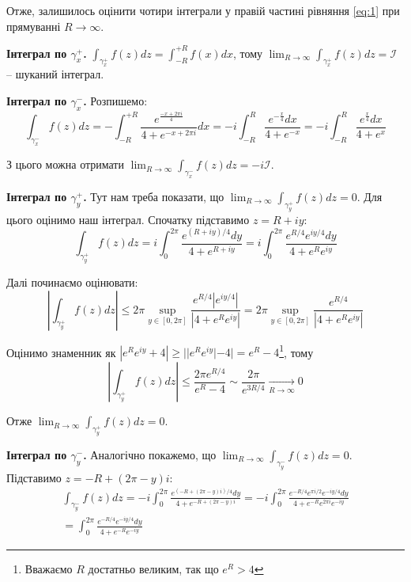\documentclass[oneside,solution]{karazin-complan-assign}
\begin{document}
Отже, залишилось оцінити чотири інтеграли у правій частині рівняння \ref{eq:1} при прямуванні $R \to \infty$. 

\textbf{Інтеграл по $\gamma_x^+$.} $\int_{\gamma_x^+}f(z)dz = \int_{-R}^{+R}f(x)dx$, тому $\lim_{R \to \infty}\int_{\gamma_x^+}f(z)dz = \mathcal{I}$ -- шуканий інтеграл.

\textbf{Інтеграл по $\gamma_x^-$.} Розпишемо:
\begin{equation}
    \int_{\gamma_x^-}f(z)dz = -\int_{-R}^{+R} \frac{e^{\frac{-x+2\pi i}{4}}}{4+e^{-x+2\pi i}}dx = -i \int_{-R}^R \frac{e^{-\frac{x}{4}}dx}{4+e^{-x}} = -i \int_{-R}^R \frac{e^{\frac{x}{4}}dx}{4+e^{x}}
\end{equation}

З цього можна отримати $\lim_{R \to \infty} \int_{\gamma_x^-}f(z)dz = -i\mathcal{I}$. 

\textbf{Інтеграл по $\gamma_y^+$.} Тут нам треба показати, що $\lim_{R \to \infty}\int_{\gamma_y^+}f(z)dz = 0$. Для цього оцінимо наш інтеграл. Спочатку підставимо $z=R+iy$:
\begin{equation}
    \int_{\gamma_y^+}f(z)dz = i\int_0^{2\pi} \frac{e^{(R+iy)/4}dy}{4+e^{R+iy}} = i \int_0^{2\pi} \frac{e^{R/4}e^{iy/4}dy}{4+e^Re^{iy}}
\end{equation}

Далі починаємо оцінювати:
\begin{equation}
    \left|\int_{\gamma_y^+}f(z)dz\right| \leq 2\pi \sup_{y \in [0,2\pi]} \frac{e^{R/4}|e^{iy/4}|}{|4+e^Re^{iy}|} = 2\pi \sup_{y \in [0,2\pi]} \frac{e^{R/4}}{|4+e^Re^{iy}|}
\end{equation}

Оцінимо знаменник як $|e^Re^{iy} + 4| \geq ||e^Re^{iy}| - 4| = e^R - 4$\footnote{Вважаємо $R$ достатньо великим, так що $e^R > 4$}, тому
\begin{equation}
    \left|\int_{\gamma_y^+}f(z)dz\right| \leq \frac{2\pi e^{R/4}}{e^R - 4} \sim \frac{2\pi}{e^{3R/4}} \xrightarrow[R \to \infty]{} 0 
\end{equation}

Отже $\lim_{R \to \infty}\int_{\gamma_y^+}f(z)dz = 0$. 

\textbf{Інтеграл по $\gamma_y^-$.} Аналогічно покажемо, що $\lim_{R \to \infty}\int_{\gamma_y^-}f(z)dz = 0$. Підставимо $z=-R+(2\pi - y)i$:
\begin{gather}
    \int_{\gamma_y^-}f(z)dz = -i\int_0^{2\pi} \frac{e^{(-R+(2\pi - y)i)/4}dy}{4+e^{-R+(2\pi - y)i}} = -i \int_0^{2\pi} \frac{e^{-R/4}e^{\pi i/2}e^{-iy/4}dy}{4+e^{-R}e^{2\pi i}e^{-iy}} \nonumber \\
    = \int_0^{2\pi} \frac{e^{-R/4}e^{-iy/4}dy}{4+e^{-R}e^{-iy}}
\end{gather}
\end{document}
